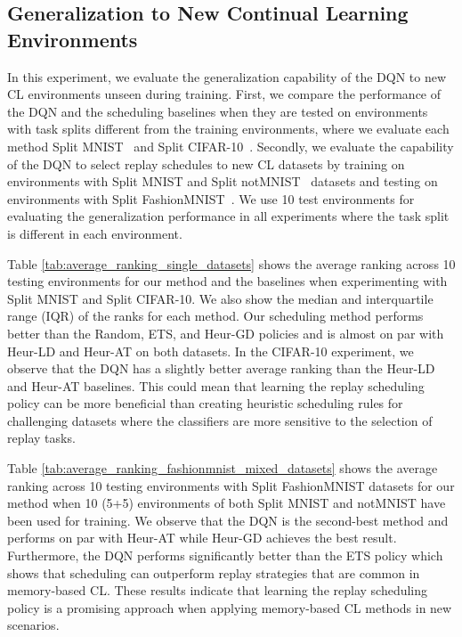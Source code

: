 \subsection{Generalization to New Continual Learning Environments}
In this experiment, we evaluate the generalization capability of the DQN to new CL environments unseen during training. First, we compare the performance of the DQN and the scheduling baselines when they are tested on environments with task splits different from the training environments, where we evaluate each method Split MNIST~ and Split CIFAR-10~. Secondly, we evaluate the capability of the DQN to select replay schedules to new CL datasets by training on environments with Split MNIST and Split notMNIST~ datasets and testing on environments with Split FashionMNIST~. We use 10 test environments for evaluating the generalization performance in all experiments where the task split is different in each environment.



Table \ref{tab:average_ranking_single_datasets} shows the average ranking across 10 testing environments for our method and the baselines when experimenting with Split MNIST and Split CIFAR-10. We also show the median and interquartile range (IQR) of the ranks for each method. Our scheduling method performs better than the Random, ETS, and Heur-GD policies and is almost on par with Heur-LD and Heur-AT on both datasets. In the CIFAR-10 experiment, we observe that the DQN has a slightly better average ranking than the Heur-LD and Heur-AT baselines. This could mean that learning the replay scheduling policy can be more beneficial than creating heuristic scheduling rules for challenging datasets where the classifiers are more sensitive to the selection of replay tasks. 

Table \ref{tab:average_ranking_fashionmnist_mixed_datasets} shows the average ranking across 10 testing environments with Split FashionMNIST datasets for our method when 10 (5+5) environments of both Split MNIST and notMNIST have been used for training. We observe that the DQN is the second-best method and performs on par with Heur-AT while Heur-GD achieves the best result. Furthermore, the DQN performs significantly better than the ETS policy which shows that scheduling can outperform replay strategies that are common in memory-based CL. These results indicate that learning the replay scheduling policy is a promising approach when applying memory-based CL methods in new scenarios. 





